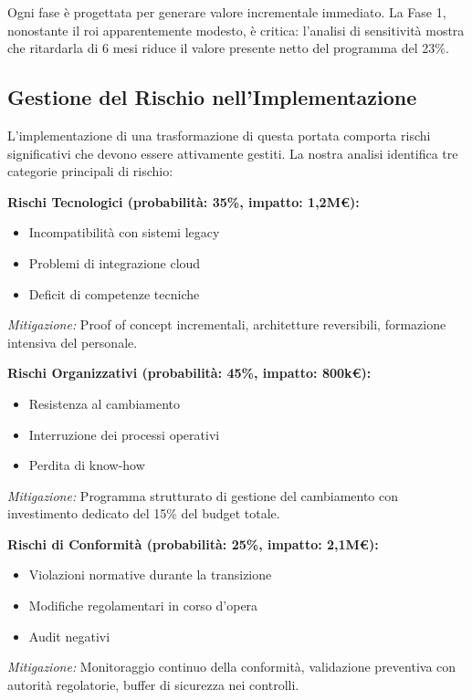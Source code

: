 Ogni fase è progettata per generare valore incrementale immediato. La Fase 1, nonostante il \gls{roi} apparentemente modesto, è critica: l'analisi di sensitività mostra che ritardarla di 6 mesi riduce il valore presente netto del programma del 23\%.

\subsection{\texorpdfstring{Gestione del Rischio nell'Implementazione}{5.4.2 - Gestione del Rischio nell'Implementazione}}
\label{subsec:5.4.2}

L'implementazione di una trasformazione di questa portata comporta rischi significativi che devono essere attivamente gestiti. La nostra analisi identifica tre categorie principali di rischio:

\textbf{Rischi Tecnologici (probabilità: 35\%, impatto: 1,2M€):}
\begin{itemize}
\item Incompatibilità con sistemi legacy
\item Problemi di integrazione cloud
\item Deficit di competenze tecniche
\end{itemize}

\textit{Mitigazione:} Proof of concept incrementali, architetture reversibili, formazione intensiva del personale.

\textbf{Rischi Organizzativi (probabilità: 45\%, impatto: 800k€):}
\begin{itemize}
\item Resistenza al cambiamento
\item Interruzione dei processi operativi
\item Perdita di know-how
\end{itemize}

\textit{Mitigazione:} Programma strutturato di gestione del cambiamento con investimento dedicato del 15\% del budget totale.

\textbf{Rischi di Conformità (probabilità: 25\%, impatto: 2,1M€):}
\begin{itemize}
\item Violazioni normative durante la transizione
\item Modifiche regolamentari in corso d'opera
\item Audit negativi
\end{itemize}

\textit{Mitigazione:} Monitoraggio continuo della conformità, validazione preventiva con autorità regolatorie, buffer di sicurezza nei controlli.

